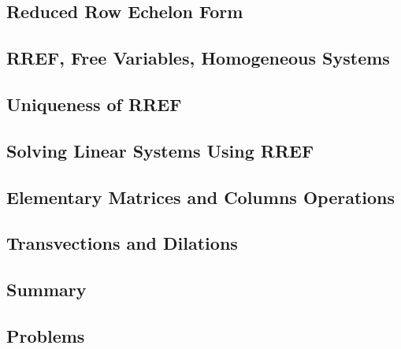 \documentclass[a4paper]{article}
\begin{document}
\subsection{ Reduced Row Echelon Form} %

\subsection{ RREF, Free Variables, Homogeneous Systems} %

\subsection{ Uniqueness of RREF} %

\subsection{ Solving Linear Systems Using RREF} %

\subsection{ Elementary Matrices and Columns Operations} %

\subsection{ Transvections and Dilations} %

\subsection{ Summary} %

\subsection{ Problems} %
\end{document}
